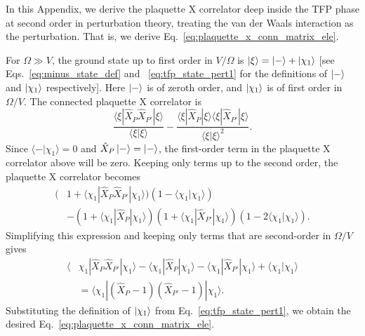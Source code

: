 \documentclass[twocolumn,superscriptaddress,amsmath,amssymb,aps,prx,nofootinbib]{revtex4-2}
\begin{document}
In this Appendix, we derive  the plaquette X correlator deep inside the TFP phase at second order in perturbation theory, treating the van der Waals interaction as the perturbation. That is, we derive Eq.~\eqref{eq:plaquette_x_conn_matrix_ele}. 

For $\Omega \gg V$, the ground state up to  first order in $V/\Omega$ is $\ket{\xi} = \ket{-} +\ket{\chi_1} $ [see Eqs.~\eqref{eq:minus_state_def} and ~\eqref{eq:tfp_state_pert1} for the definitions of $\ket{-}$ and $\ket{\chi_1}$ respectively]. Here $\ket{-}$ is of zeroth order, and $\ket{\chi_1}$ is of first order in $\Omega/V$.  The connected plaquette X correlator is
\begin{equation}
    \frac{\langle \xi | \hat{X}_P \hat{X}_{P'}| \xi \rangle}{\langle \xi | \xi \rangle} -    \frac{\langle \xi | \hat{X}_P | \xi \rangle\langle \xi | \hat{X}_{P'} | \xi \rangle}{\langle \xi | \xi \rangle^2}.    
\end{equation}
Since $\langle - | \chi_1 \rangle = 0$ and $\hat{X}_P \ket{-} = \ket{-}$, the first-order term in the plaquette X correlator above will be zero. Keeping only terms up to the second order, the plaquette X correlator becomes
\begin{equation}
\begin{aligned}
    (&1+\langle \chi_1 | \hat{X}_{P}\hat{X}_{P'} | \chi_1 \rangle )( 1- \langle \chi_1 | \chi_1 \rangle )\\
    & - (1+\langle \chi_1 | \hat{X}_P | \chi_1\rangle ) (1+\langle \chi_1 | \hat{X}_{P'} | \chi_1\rangle ) (1-2\langle \chi_1 | \chi_1\rangle ). 
    \end{aligned}
\end{equation}
Simplifying this expression and keeping only terms that are second-order in $\Omega/V$ gives
\begin{equation}
\begin{aligned}
    \langle &\chi_1 | \hat{X}_{P}\hat{X}_{P'} | \chi_1 \rangle - \langle \chi_1 | \hat{X}_{P}| \chi_1 \rangle - \langle \chi_1 | \hat{X}_{P'} | \chi_1 \rangle + \langle \chi_1 | \chi_1 \rangle\\
    &= \langle \chi_1 | (\hat{X}_P - 1) (\hat{X}_{P'} - 1) | \chi_1 \rangle.
\end{aligned}
\end{equation}
Substituting the definition of $\ket{\chi_1}$ from Eq.~\eqref{eq:tfp_state_pert1}, we obtain the desired Eq.~\eqref{eq:plaquette_x_conn_matrix_ele}.
\end{document}
